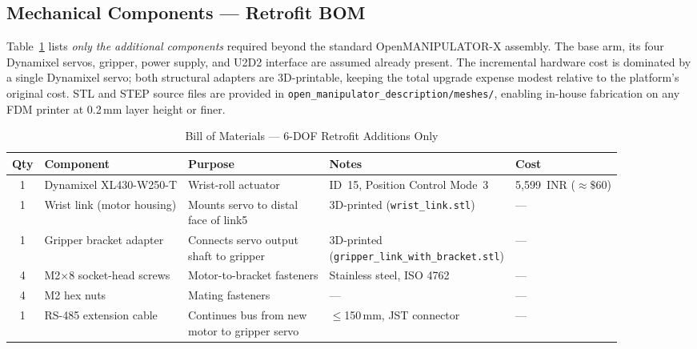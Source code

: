 \documentclass[conference]{IEEEtran}
\begin{document}
	\subsection{Mechanical Components --- Retrofit BOM}
	
	Table~\ref{tab:bom} lists \textit{only the additional components}
	required beyond the standard OpenMANIPULATOR-X assembly. The base
	arm, its four Dynamixel servos, gripper, power supply, and U2D2
	interface are assumed already present. The incremental hardware cost
	is dominated by a single Dynamixel servo; both structural adapters
	are 3D-printable, keeping the total upgrade expense modest relative
	to the platform's original cost. STL and STEP source files are
	provided in \texttt{open\_manipulator\_description/meshes/}, enabling
	in-house fabrication on any FDM printer at 0.2\,mm layer height or
	finer.
	
	\begin{table}[t]
		\centering
		\caption{Bill of Materials --- 6-DOF Retrofit Additions Only}
		\label{tab:bom}
		\renewcommand{\arraystretch}{2.5}
		\small
		\begin{tabular}{cllll}
			\toprule
			\textbf{Qty} & \textbf{Component} & \textbf{Purpose} & \textbf{Notes} & \textbf{Cost} \\
			\midrule
			1 & Dynamixel XL430-W250-T
			& Wrist-roll actuator
			& ID~15, Position Control Mode~3
			& 5{,}599~INR ($\approx \$60$)\\
			
			1 & Wrist link (motor housing)
			& \makecell[l]{Mounts servo to distal\\face of link5}
			& 3D-printed (\texttt{wrist\_link.stl})
			& --- \\
			
			1 & Gripper bracket adapter
			& \makecell[l]{Connects servo output\\shaft to gripper}
			& \makecell[l]{3D-printed\\(\texttt{gripper\_link\_with\_bracket.stl})}
			& --- \\
			
			4 & M2$\times$8 socket-head screws
			& Motor-to-bracket fasteners
			& Stainless steel, ISO 4762
			& --- \\
			
			4 & M2 hex nuts
			& Mating fasteners
			& ---
			& --- \\
			
			1 & RS-485 extension cable
			& \makecell[l]{Continues bus from new\\motor to gripper servo}
			& $\leq$150\,mm, JST connector
			& --- \\
			\bottomrule
		\end{tabular}
	\end{table}
	
\end{document}

